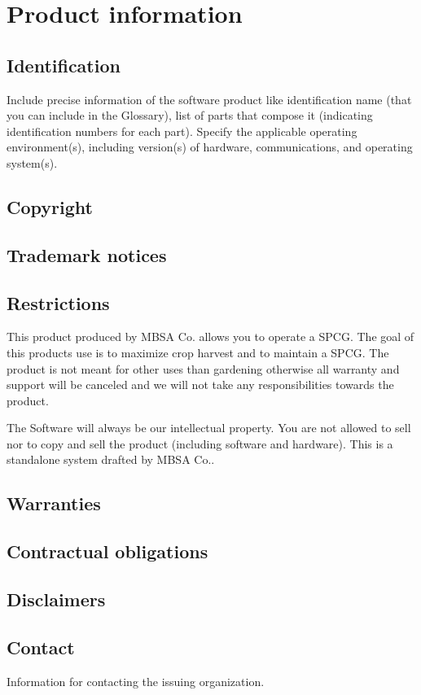 \chapter{Product information}
\vspace{-6em}


\section{Identification}
Include precise information of the software product like identification name (that you can include in the \gls{Glossary}), list of parts that compose it (indicating identification numbers for each part). 
Specify the applicable operating environment(s), including version(s) of hardware, communications, and operating system(s).

\section{Copyright}

\section{Trademark notices}

\section{Restrictions}
This product produced by MBSA Co. allows you to operate a SPCG. The goal of this
products use is to maximize crop harvest and to maintain a SPCG. The product is
not meant for other uses than gardening otherwise all warranty and support will
be canceled and we will not take any responsibilities towards the product.

The Software will always be our intellectual property. You are not allowed to sell nor to copy and sell the product (including software and hardware). This is a standalone system drafted by MBSA Co..

\section{Warranties}

\section{Contractual obligations}

\section{Disclaimers}

\section{Contact}
Information for contacting the issuing organization.